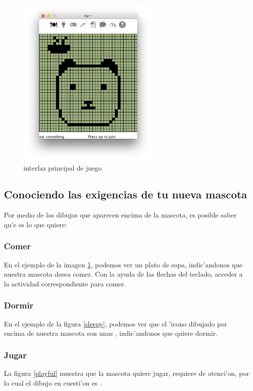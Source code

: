 \documentclass[12pt]{amsart}
\begin{document}
\begin{figure}
	\includegraphics[width=7cm]{images/Botones.jpg}
	\caption{interfaz principal de juego}
	\label{botones}
\end{figure}

\subsection{Conociendo las exigencias de tu nueva mascota}
Por medio de los dibujos que aparecen encima de la mascota, es posible saber qu'e es lo que quiere:\\

\subsubsection{Comer}
En el ejemplo de la imagen \ref{botones}, podemos ver un plato de sopa, indic'andonos que nuestra mascota desea comer. Con la ayuda de las flechas del teclado, acceder a la actividad correspondiente para comer.

\subsubsection{Dormir}
En el ejemplo de la figura \ref{sleepy}, podemos ver que el 'icono dibujado por encima de nuestra mascota son unas , indic'andonos que quiere dormir.

\subsubsection{Jugar}
La figura \ref{playful} muestra que la mascota quiere jugar, requiere de atenci'on, por lo cual el dibujo en cuesti'on es \say{!!}.
\end{document}
